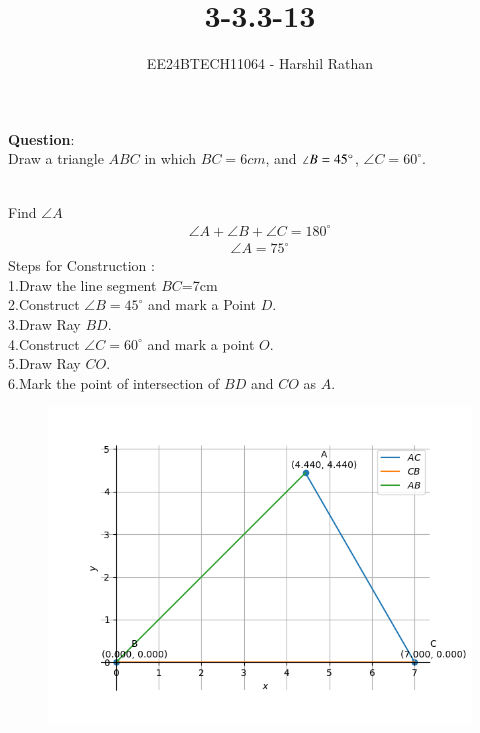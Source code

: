 \documentclass[journal]{IEEEtran}
\begin{document}

\vspace{3cm}

\title{3-3.3-13}
\author{EE24BTECH11064 - Harshil Rathan}
{\let\newpage\relax\maketitle}

\renewcommand{\thefigure}{\theenumi}
\renewcommand{\thetable}{\theenumi}
\setlength{\intextsep}{10pt} %


\renewcommand{\thetable}{\theenumi}
\textbf{Question}:\\
Draw a triangle $ABC$ in which $BC = 6cm$, and $\angle B = 45\degree$, $\angle{C}=60^\circ$.\\
\solution \\
\begin{table}[h!]
    \centering
    
\end{table}
Find $\angle{A}$
\begin{align}
     \angle{A}+\angle{B}+\angle{C}=180^\circ 
\end{align}    
\begin{align}    
     \angle{A}=75^\circ
\end{align}
Steps for Construction :\\
1.Draw the line segment $BC$=7cm \\
2.Construct $\angle B = 45^\circ$ and mark a Point $D$.\\
3.Draw Ray $BD$.\\
4.Construct $\angle C = 60^\circ$ and mark a point $O$.\\
5.Draw Ray $CO$.\\
6.Mark the point of intersection of $BD$ and $CO$ as $A$.\\
\begin{figure}[h!]
   \centering
   \includegraphics[width=\linewidth]{figs/Figure_1.png}
   \caption{}
   \label{stemplot}
\end{figure}
\end{document}

